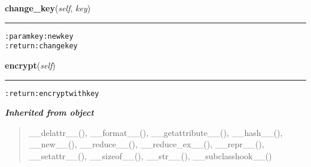     \label{hal:maths:crypt:IDEA:change_key}

    \vspace{0.5ex}

\hspace{.8\funcindent}\begin{boxedminipage}{\funcwidth}

    \raggedright \textbf{change\_key}(\textit{self}, \textit{key})

    \vspace{-1.5ex}

    \rule{\textwidth}{0.5\fboxrule}
\setlength{\parskip}{2ex}
\begin{alltt}

:param key: new key
:return: change key
\end{alltt}

\setlength{\parskip}{1ex}
    \end{boxedminipage}

    \label{hal:maths:crypt:IDEA:encrypt}

    \vspace{0.5ex}

\hspace{.8\funcindent}\begin{boxedminipage}{\funcwidth}

    \raggedright \textbf{encrypt}(\textit{self})

    \vspace{-1.5ex}

    \rule{\textwidth}{0.5\fboxrule}
\setlength{\parskip}{2ex}
\begin{alltt}

:return: encrypt with key
\end{alltt}

\setlength{\parskip}{1ex}
    \end{boxedminipage}


\large{\textbf{\textit{Inherited from object}}}

\begin{quote}
\_\_delattr\_\_(), \_\_format\_\_(), \_\_getattribute\_\_(), \_\_hash\_\_(), \_\_new\_\_(), \_\_reduce\_\_(), \_\_reduce\_ex\_\_(), \_\_repr\_\_(), \_\_setattr\_\_(), \_\_sizeof\_\_(), \_\_str\_\_(), \_\_subclasshook\_\_()
\end{quote}

